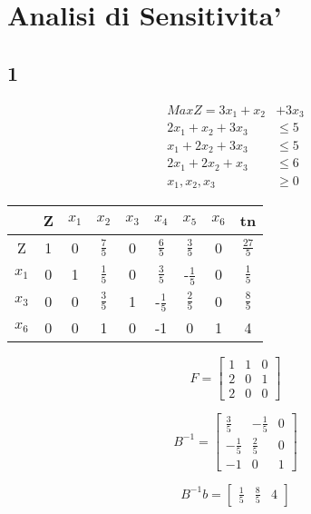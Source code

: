 \chapter{Analisi di Sensitivita'}

\section{1}

\begin{align*}
    Max Z = 3x_1 + x_2  &+ 3x_3 \\
    2x_1 + x_2 + 3x_3 &\leq 5 \\
    x_1 + 2x_2 + 3x_3 &\leq 5 \\
    2x_1 + 2x_2 + x_3 &\leq 6 \\
    x_1,x_2,x_3 &\geq 0
\end{align*}

\begin{center}
    \begin{tabular}{||c c c c c c c c c||}
        \hline
        & Z & $x_1$ & $x_2$ & $x_3$ & $x_4$ & $x_5$ & $x_6$ & tn \\
        \hline
        Z & 1 & 0 & $\frac {7} {5}$ & 0 & $\frac {6} {5}$ & $\frac {3} {5}$ & 0 & $\frac {27} {5}$ \\
        $x_1$ & 0 & 1 & $\frac 1 5$ & 0 & $\frac 3 5$ & -$\frac 1 5$ & 0 & $\frac 1 5$ \\
        $x_3$ & 0 & 0 & $\frac 3 5$ & 1 & -$\frac 1 5$ & $\frac 2 5$ & 0 & $\frac 8 5$ \\
        $x_6$ & 0 & 0 & 1 & 0 & -1 & 0 & 1 & 4 \\
        \hline
    \end{tabular}
\end{center}

\[
    F = 
    \begin{bmatrix}
        1 & 1 & 0 \\
        2 & 0 & 1 \\
        2 & 0 & 0
    \end{bmatrix}
\]

\[
    B^{-1} = 
    \begin{bmatrix}
          \frac 3 5 & - \frac 1 5 & 0 \\
        - \frac 1 5 &   \frac 2 5 & 0 \\
        - 1         & 0           & 1
    \end{bmatrix}
\]

\[
    B^{-1}b =
    \begin{bmatrix}
        \frac 1 5 & \frac 8 5 & 4
    \end{bmatrix}
\]

